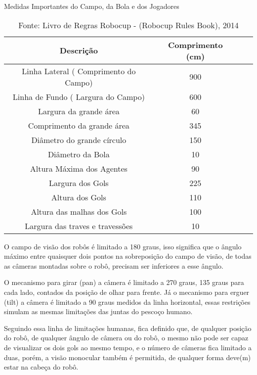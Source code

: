 \begin{table}[ht!]
    \caption{Medidas Importantes do Campo, da Bola e dos Jogadores} \label{tbl:medidas}
    \centering
    \begin{tabular}{|c|c|c|c|}
    \hline 
    Descrição & Comprimento (cm) \\ 
    \hline 
    Linha Lateral ( Comprimento do Campo) & 900  \\ 
    \hline 
    Linha de Fundo ( Largura do Campo) & 600 \\ 
    \hline 
    Largura da grande área & 60 \\ 
    \hline 
    Comprimento da grande área & 345 \\ 
    \hline 
    Diâmetro do grande círculo & 150 \\ 
    \hline 
    Diâmetro da Bola & 10 \\ 
    \hline 
    Altura Máxima dos Agentes & 90 \\ 
    \hline 
    Largura dos Gols & 225 \\ 
    \hline
    Altura dos Gols & 110 \\
    \hline
    Altura das malhas dos Gols & 100 \\
    \hline
    Largura das traves e travessões & 10 \\
    \hline


    \end{tabular}
    \caption*{Fonte: Livro de Regras Robocup - (Robocup Rules Book), 2014 \cite{Rules}}
\end{table}

O campo de visão dos robôs é limitado a 180 graus, isso significa que o ângulo máximo entre quaisquer dois pontos na sobreposição do campo de visão, de todas as câmeras montadas sobre o robô, precisam ser inferiores a esse ângulo. 

O mecanismo para girar (pan) a câmera é limitado a 270 graus, 135 graus para cada lado, contados da posição de olhar para frente. Já o mecanismo para erguer (tilt) a câmera é limitado a 90 graus medidos da linha horizontal, essas restrições simulam as mesmas limitações das juntas do pescoço humano. 

Seguindo essa linha de limitações humanas, fica definido que, de qualquer posição do robô, de qualquer ângulo de câmera ou do robô, o mesmo não pode ser capaz de visualizar os dois gols ao mesmo tempo, e o número de câmeras fica limitado a duas, porém, a visão monocular também é permitida, de qualquer forma deve(m) estar na cabeça do robô.

